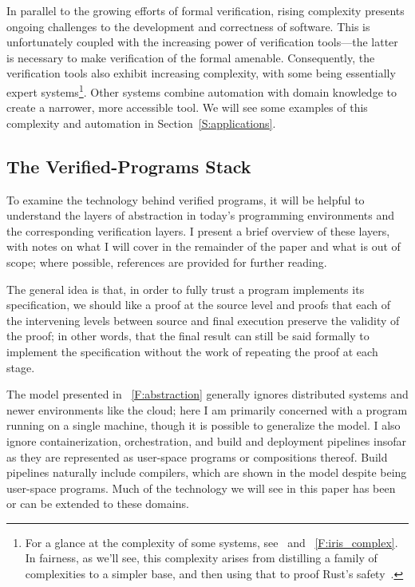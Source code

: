 In parallel to the growing efforts of formal verification, rising complexity
presents ongoing challenges to the development and correctness of software. This
is unfortunately coupled with the increasing power of verification tools---the
latter is necessary to make verification of the formal amenable. Consequently,
the verification tools also exhibit increasing complexity, with some being
essentially expert systems\footnote{For a glance at the complexity of some
systems, see~\cite{Jung_2015,Jung_2016,Krebbers_2017,Jung_2018b} and
\figurename~\ref{F:iris_complex}. In fairness, as we'll see, this complexity
arises from distilling a family of complexities to a simpler base, and then
using that to proof Rust's safety~\cite{Jung_2018a}.}. Other systems combine
automation with domain knowledge to create a narrower, more accessible tool. We
will see some examples of this complexity and automation in
Section~\ref{S:applications}.

\subsection{The Verified-Programs Stack}

To examine the technology behind verified programs, it will be helpful to
understand the layers of abstraction in today's programming environments and the
corresponding verification layers. I present a brief overview of these layers,
with notes on what I will cover in the remainder of the paper and what is out of
scope; where possible, references are provided for further reading.

The general idea is that, in order to fully trust a program implements its
specification, we should like a proof at the source level and proofs that each
of the intervening levels between source and final execution preserve the
validity of the proof; in other words, that the final result can still be said
formally to implement the specification without the work of repeating the proof
at each stage.

The model presented in \figurename~\ref{F:abstraction} generally ignores
distributed systems and newer environments like the cloud; here I am primarily
concerned with a program running on a single machine, though it is possible to
generalize the model. I also ignore containerization, orchestration, and build
and deployment pipelines insofar as they are represented as user-space programs
or compositions thereof. Build pipelines naturally include compilers, which are
shown in the model despite being user-space programs. Much of the technology we
will see in this paper has been or can be extended to these domains.

